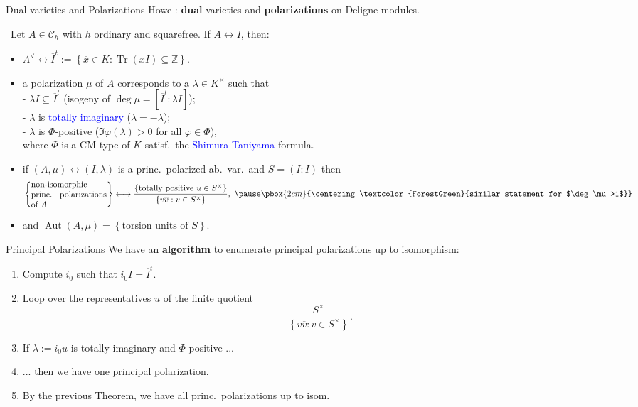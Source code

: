 \documentclass[usenames,dvipsnames]{beamer}
\def\Z{\mathbb{Z}}
\DeclareMathOperator{\Aut}{Aut}
\DeclareMathOperator{\Tr}{Tr}
\newcommand{\cC}{{\mathcal C}}
\newcommand{\vphi}{\varphi}
\newcommand{\set}[1]{\left\lbrace#1\right\rbrace }
\newcommand{\blue}[1]{\textcolor{blue}{#1}}
\newcommand{\green}[1]{\textcolor{ForestGreen}{#1}}
\begin{document}
\begin{frame}{Dual varieties and Polarizations }
    Howe \cite{Howe95} : \textbf{dual} varieties and \textbf{polarizations} on Deligne modules.
\pause
    \begin{theorem}\
    Let $A\in \cC_h$ with $h$ ordinary and squarefree. If $A\leftrightarrow I$, then:
    \begin{itemize}
\pause
    \item $A^\vee \leftrightarrow \overline{I}^t:=\set{ \overline{x} \in K : \Tr(xI)\subseteq \Z}$.
\pause
    \item a polarization $\mu$ of $A$ corresponds to a $\lambda\in K^\times$ such that\\
    - $\lambda I \subseteq \overline{I}^t$ (isogeny of $\deg \mu= [\overline{I}^t : \lambda I]$);\\
    - $\lambda$ is \blue{totally imaginary} ($\overline \lambda = -\lambda$);\\
    - $\lambda$ is $\Phi$-positive ($\Im\vphi(\lambda)>0$ for all $\vphi\in \Phi$),\\
     where $\Phi$ is a CM-type of $K$ satisf.~the \blue{Shimura-Taniyama} formula.\\ 
\pause
    \item if $(A,\mu) \leftrightarrow (I,\lambda)$ is a princ.~polarized ab.~var.~and $S=(I:I)$ then
    \vspace{-0.8em}
    \[\set{\parbox[p]{9em}{non-isomorphic princ. polarizations of $A$}} \longleftrightarrow \dfrac{\set{\text{totally positive }u\in S^\times }}{\set{v\overline{v}: v\in S^\times}},\
\pause
    \pbox{2cm}{\centering \green{similar statement for $\deg\mu>1$}}   
    \]
    \vspace{-1.7em}
\pause
    \item  and $\Aut(A,\mu) = \set{\text{torsion units of $S$}}$.
    \end{itemize}
    \end{theorem}
\end{frame}


\begin{frame}{Principal Polarizations}
    We have an {\bf algorithm} to enumerate principal polarizations up to isomorphism:
\pause
    \begin{enumerate}
    \item Compute $i_0$ such that $i_0 I = \overline{I}^t$.
\pause
    \item Loop over the representatives $u$ of the finite quotient
    \[ \frac{S^\times}{\set{v\overline{v}: v\in S^\times}}. \]
\pause    
    \item If $\lambda:=i_0 u$ is totally imaginary and $\Phi$-positive ...
\pause    
    \item ... then we have one principal polarization.
\pause    
    \item By the previous Theorem, we have all princ.~polarizations up to isom.
    \end{enumerate}
\end{frame}
\end{document}
